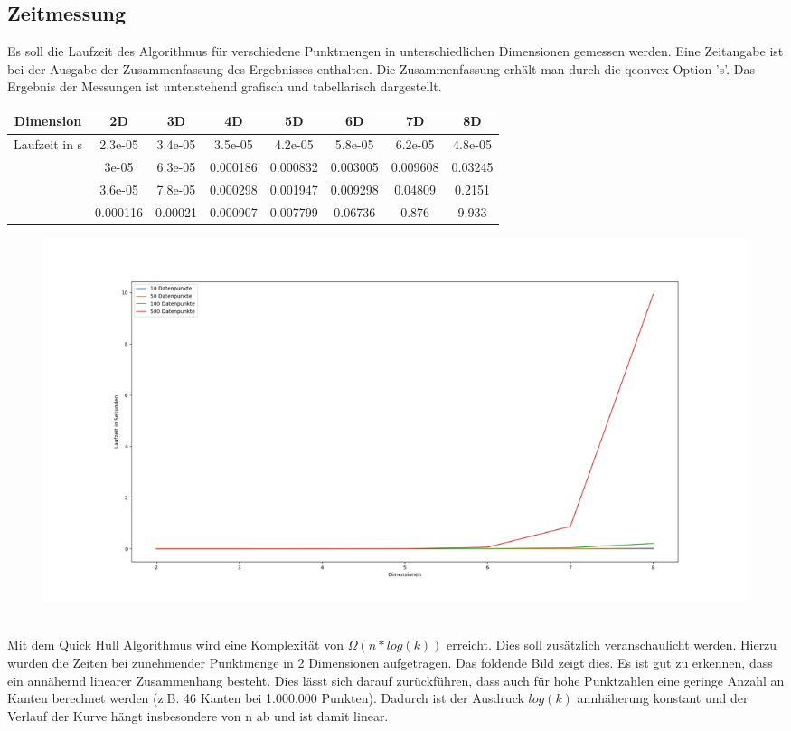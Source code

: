 \documentclass[12pt]{scrartcl}
\begin{document}
\subsection{Zeitmessung}
Es soll die Laufzeit des Algorithmus für verschiedene Punktmengen in unterschiedlichen Dimensionen gemessen werden.  Eine Zeitangabe ist bei der Ausgabe der Zusammenfassung des Ergebnisses enthalten. Die Zusammenfassung erhält man durch die qconvex Option 's'. Das Ergebnis der Messungen ist untenstehend grafisch und tabellarisch dargestellt.
\begin{center}
\begin{tabular}{||c | c c c c c c c||} 
    \hline
    Dimension & 2D &       3D &      4D &       5D &       6D &       7D &       8D      \\
    \hline \hline
    \multirow{4}{*}{Laufzeit in s} & 2.3e-05 &  3.4e-05 & 3.5e-05 &  4.2e-05 &  5.8e-05 &  6.2e-05 &  4.8e-05 \\ \cline{2-8}
                                   & 3e-05 &    6.3e-05 & 0.000186 & 0.000832 & 0.003005 & 0.009608 & 0.03245 \\ \cline{2-8}
                                   & 3.6e-05 &  7.8e-05 & 0.000298 & 0.001947 & 0.009298 & 0.04809 &  0.2151  \\ \cline{2-8}
                                   & 0.000116 & 0.00021 & 0.000907 & 0.007799 & 0.06736 &  0.876 &    9.933   \\ \hline
\end{tabular}
\end{center}

\begin{figure}[H]
    \centering
    \includegraphics[scale=0.32]{runtimes.png}
\end{figure}

\ \\ 
Mit dem Quick Hull Algorithmus wird eine Komplexität von $\Omega(n*log(k))$ erreicht. Dies soll zusätzlich veranschaulicht werden. 
Hierzu wurden die Zeiten bei zunehmender Punktmenge in 2 Dimensionen aufgetragen. Das foldende Bild zeigt dies. Es ist gut zu erkennen, dass ein annähernd linearer Zusammenhang besteht. Dies lässt sich darauf zurückführen, dass auch für hohe Punktzahlen eine geringe Anzahl an Kanten berechnet werden (z.B. 46 Kanten bei 1.000.000 Punkten). Dadurch ist der Ausdruck $log(k)$ annhäherung konstant und der Verlauf der Kurve hängt insbesondere von n ab und ist damit linear.
\end{document}
